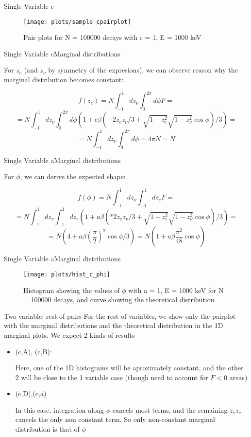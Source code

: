 \documentclass{beamer}
\begin{document}
\begin{frame}{Single Variable c}
	\begin{figure}
		\centering
		\texttt{[image: plots/sample\_cpairplot]}
		\caption{Pair plots for N = 100000 decays with c = 1, E = 1000 keV}
	\end{figure}
\end{frame}
\begin{frame}{Single Variable c}{Marginal distributions}

	
	For $z_e$ (and $z_\nu$ by symmetry of the expresions), we can observe reason why the marginal distribution becomes constant: 
	
	$$f(z_e) = N\int_{-1}^{1}dz_\nu\int_{0}^{2\pi}d\phi F =$$$$= N\int_{-1}^{1}dz_\nu\int_{0}^{2\pi}d\phi (1 + c\beta(-2z_ez_\nu/3+\sqrt{1-z^2_e}\sqrt{1-z^2_\nu}\cos \phi)/3) = $$$$ = N\int_{-1}^{1}dz_\nu\int_{0}^{2\pi}d\phi = 4\pi N = N $$

	
\end{frame}
\begin{frame}{Single Variable a}{Marginal distributions}
	
	
	For $\phi$, we can derive the expected shape: 
	
	$$f(\phi) = N\int_{-1}^{1}dz_\nu\int_{-1}^{1}dz_e F =$$$$= N\int_{-1}^{1}dz_\nu\int_{-1}^{1}dz_e (1 + a\beta(*2z_ez_\nu/3+\sqrt{1-z^2_e}\sqrt{1-z^2_\nu}\cos \phi)/3) = $$$$ = N\left(4+a\beta\left(\frac{\pi}{2}\right)^2\cos\phi/3\right) = N\left(1+a\beta\frac{\pi^2}{48}\cos\phi\right)  $$
	
	
\end{frame}
\begin{frame}{Single Variable a}{Marginal distributions}
	
	\begin{figure}
		\centering
		\texttt{[image: plots/hist\_c\_phi]}
		\caption{Histogram showing the values of $\phi$ with a = 1, E = 1000 keV for N = 100000 decays, and curve showing the theoretical distribution}
	\end{figure}
\end{frame}
\begin{frame}{Two variable: rest of pairs}
	For the rest of variables, we show only the pairplot with the marginal distributions and the theoretical distribution in the 1D marginal plots. We expect 2 kinds of results
	
	\begin{itemize}
		\item (c,A), (c,B):
		
		Here, one of the 1D histograms will be aproximately constant, and the other 2 will be close to the 1 variable case (though need to account for $F < 0$ areas)
		
		\item (c,D),(c,a)
		
		In this case, integration along $\phi$ cancels most terms, and the remaining $z_ez_\nu$ cancels the only non constant term. So only non-constant marginal distribution is that of $\phi$

	\end{itemize}
\end{frame}
\end{document}
